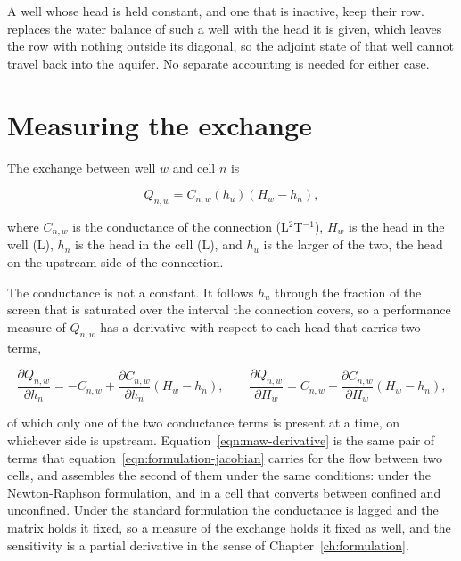 A well whose head is held constant, and one that is inactive, keep their row. \mf{} replaces the water balance of such a well with the head it is given, which leaves the row with nothing outside its diagonal, so the adjoint state of that well cannot travel back into the aquifer. No separate accounting is needed for either case.

\section*{Measuring the exchange}

The exchange between well $w$ and cell $n$ is

\begin{equation}
	\label{eqn:maw-exchange}
	Q_{n,w} = C_{n,w}\left(h_{u}\right) \left( H_{w} - h_{n} \right),
\end{equation}

\noindent where $C_{n,w}$ is the conductance of the connection (L$^{2}$T$^{-1}$), $H_{w}$ is the head in the well (L), $h_{n}$ is the head in the cell (L), and $h_{u}$ is the larger of the two, the head on the upstream side of the connection.

The conductance is not a constant. It follows $h_{u}$ through the fraction of the screen that is saturated over the interval the connection covers, so a performance measure of $Q_{n,w}$ has a derivative with respect to each head that carries two terms,

\begin{equation}
	\label{eqn:maw-derivative}
	\frac{\partial Q_{n,w}}{\partial h_{n}} =
	-C_{n,w} + \frac{\partial C_{n,w}}{\partial h_{n}}
	\left( H_{w} - h_{n} \right), \qquad
	\frac{\partial Q_{n,w}}{\partial H_{w}} =
	C_{n,w} + \frac{\partial C_{n,w}}{\partial H_{w}}
	\left( H_{w} - h_{n} \right),
\end{equation}

\noindent of which only one of the two conductance terms is present at a time, on whichever side is upstream. Equation~\ref{eqn:maw-derivative} is the same pair of terms that equation~\ref{eqn:formulation-jacobian} carries for the flow between two cells, and \mf{} assembles the second of them under the same conditions: under the Newton-Raphson formulation, and in a cell that converts between confined and unconfined. Under the standard formulation the conductance is lagged and the matrix holds it fixed, so a measure of the exchange holds it fixed as well, and the sensitivity is a partial derivative in the sense of Chapter~\ref{ch:formulation}.

